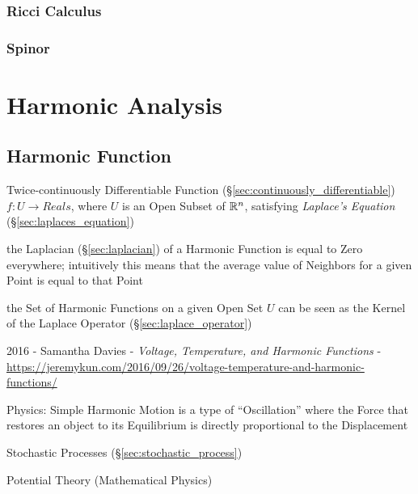\subsubsection{Ricci Calculus}\label{sec:ricci_calculus}

\subsubsection{Spinor}\label{sec:spinor}



\section{Harmonic Analysis}\label{sec:harmonic_analysis}

\subsection{Harmonic Function}\label{sec:harmonic_function}

Twice-continuously Differentiable Function
(\S\ref{sec:continuously_differentiable}) $f : U \rightarrow Reals$,
where $U$ is an Open Subset of $\mathbb{R}^n$, satisfying \emph{Laplace's
  Equation} (\S\ref{sec:laplaces_equation})

the Laplacian (\S\ref{sec:laplacian}) of a Harmonic Function is equal to Zero
everywhere; intuitively this means that the average value of Neighbors for a
given Point is equal to that Point

the Set of Harmonic Functions on a given Open Set $U$ can be seen as the Kernel
of the Laplace Operator (\S\ref{sec:laplace_operator})

2016 - Samantha Davies - \emph{Voltage, Temperature, and Harmonic
  Functions} -
\url{https://jeremykun.com/2016/09/26/voltage-temperature-and-harmonic-functions/}

Physics: Simple Harmonic Motion is a type of ``Oscillation'' where the
Force that restores an object to its Equilibrium is directly
proportional to the Displacement

Stochastic Processes (\S\ref{sec:stochastic_process})

Potential Theory (Mathematical Physics) %

